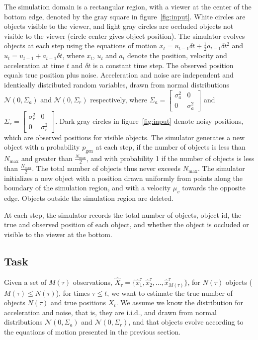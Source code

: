 \documentclass[a4paper]{article}
\newcommand{\N}{\mathcal{N}}
\newcommand{\x}{\hat{x}}
\newcommand{\X}{\hat{X}}
\begin{document}
The simulation domain is a rectangular region, with a viewer at the center
of the bottom edge, denoted by the gray square in figure~\ref{fig:input}.
White circles are objects visible to the viewer, and light gray circles
are occluded objects not visible to the viewer
(circle center gives object position).
The simulator evolves objects at each step using the equations of motion
$x_{t} = u_{t-1} \delta t + \frac{1}{2} a_{t-1} \delta t^2 $ and
$u_{t} = u_{t-1} + a_{t-1} \delta t$, where $x_t$, $u_t$ and $a_t$ denote
the position, velocity and acceleration at time $t$ and $\delta t$ is a
constant time step.
The observed position equals true position plus noise.
Acceleration and noise are independent and identically distributed random
variables, drawn from normal distributions
$\N(0, \Sigma_a)$ and $\N(0, \Sigma_r)$ respectively,
where
$\Sigma_a = \begin{bmatrix} \sigma_a^2 & 0 \\ 0 & \sigma_a^2 \end{bmatrix}$
and
$\Sigma_r = \begin{bmatrix} \sigma_r^2 & 0 \\ 0 & \sigma_r^2 \end{bmatrix}$.
Dark gray circles in figure~\ref{fig:input} denote noisy positions,
which are observed positions for visible objects.
The simulator generates a new object with a probability $p_\text{gen}$ at
each step, if the number of objects is less than $N_\text{max}$ and 
greater than $\frac{N_\text{max}}{2}$, and with probability 1 if
the number of objects is less than $\frac{N_\text{max}}{2}$. The total
number of objects thus never exceeds $N_\text{max}$.
The simulator initializes a new object with a position drawn uniformly from
points along the boundary of the simulation region, and with a velocity $\mu_v$
towards the opposite edge.
Objects outside the simulation region are deleted.

At each step, the simulator records the total number of objects, object id,
the true and observed position of each object, and whether the object is
occluded or visible to the viewer at the bottom.

\subsection{Task}

Given a set of $M(\tau)$ observations,
$\X_\tau = \{\x^\tau_1, \x^\tau_2, \ldots, \x^\tau_{M(\tau)}\}$,
for $N(\tau)$ objects ($M(\tau) \leq N(\tau)$), for times $\tau \leq t$,
we want to estimate the true number of objects $N(\tau)$ and true positions $X_t$.
We assume we know the distribution for acceleration and noise, that is, they are i.i.d.,
and drawn from normal distributions $\N(0, \Sigma_a)$ and $\N(0, \Sigma_r)$, and that
objects evolve according to the equations of motion presented in the previous section.
\end{document}
